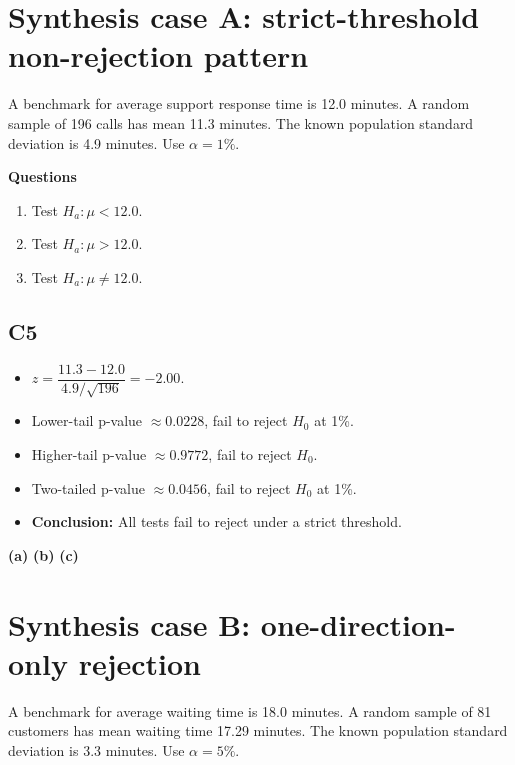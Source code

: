 \section{Synthesis case A: strict-threshold non-rejection pattern}
A benchmark for average support response time is 12.0 minutes. A random sample of 196 calls has mean 11.3 minutes. The known population standard deviation is 4.9 minutes. Use \(\alpha=1\%\).

\textbf{Questions}
\begin{enumerate}
    \item[(a)] Test \(H_a\colon \mu<12.0\).
    \item[(b)] Test \(H_a\colon \mu>12.0\).
    \item[(c)] Test \(H_a\colon \mu\ne12.0\).
\end{enumerate}

\subsection*{C5}
\begin{itemize}
    \item \(z=\dfrac{11.3-12.0}{4.9/\sqrt{196}}=-2.00\).
    \item Lower-tail p-value \(\approx0.0228\), fail to reject \(H_0\) at 1\%.
    \item Higher-tail p-value \(\approx0.9772\), fail to reject \(H_0\).
    \item Two-tailed p-value \(\approx0.0456\), fail to reject \(H_0\) at 1\%.
    \item \textbf{Conclusion:} All tests fail to reject under a strict threshold.
\end{itemize}

\begin{center}
\textbf{(a)}\;
\hspace{0.5cm}
\textbf{(b)}\;
\hspace{0.5cm}
\textbf{(c)}\;
\end{center}


\section{Synthesis case B: one-direction-only rejection}
A benchmark for average waiting time is 18.0 minutes. A random sample of 81 customers has mean waiting time 17.29 minutes. The known population standard deviation is 3.3 minutes. Use \(\alpha=5\%\).


